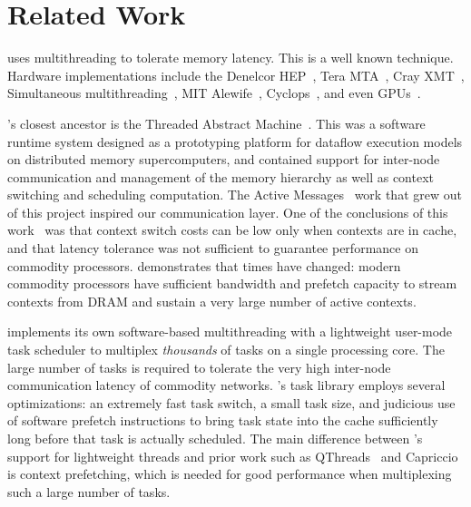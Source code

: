 \section{Related Work}

\vspace{0.5ex}
\Grappa uses multithreading to tolerate memory
latency. This is a well known technique. Hardware implementations include the
Denelcor HEP~\cite{hep}, Tera MTA~\cite{tera:mta1}, Cray XMT~\cite{feo:xmt}, Simultaneous
multithreading~\cite{tullsen:smt}, MIT Alewife~\cite{agarwal:alewife},
Cyclops~\cite{almasi:cyclops}, and even GPUs~\cite{gpus}.

\Grappa's closest ancestor is the Threaded Abstract
Machine~\cite{CullerGSvE93}. This was a software runtime system
designed as a prototyping platform for dataflow execution models on
distributed memory supercomputers, and contained support for
inter-node communication and management of the memory hierarchy as
well as context switching and scheduling computation. The Active
Messages~\cite{vonEicken92} work that grew out of
this project inspired our communication layer. One of the conclusions
of this work~\cite{Culler:1993:TFL:647025.714362} was that context
switch costs can be low only when contexts are in cache, and that
latency tolerance was not sufficient to guarantee performance on
commodity processors. \Grappa demonstrates that times have changed:
modern commodity processors have sufficient bandwidth and prefetch
capacity to stream contexts from DRAM and sustain a very large number of active contexts. 


\Grappa implements its own software-based multithreading with a
lightweight user-mode task scheduler to multiplex \emph{thousands\/} of tasks
on a single processing core. The large number of tasks is required to tolerate
the very high inter-node communication latency of commodity networks.
\Grappa's task library employs several optimizations: an extremely fast task
switch, a small task size, and judicious use of software prefetch instructions
to bring task state into the cache sufficiently long before that task is
actually scheduled. The main difference between \Grappa's support for
lightweight threads and prior work such as
QThreads~\cite{Wheeler08qthreads:an} and
Capriccio~\cite{Behren03capriccio:scalable} is context prefetching, which is needed for good performance when multiplexing such a large
number of tasks.

